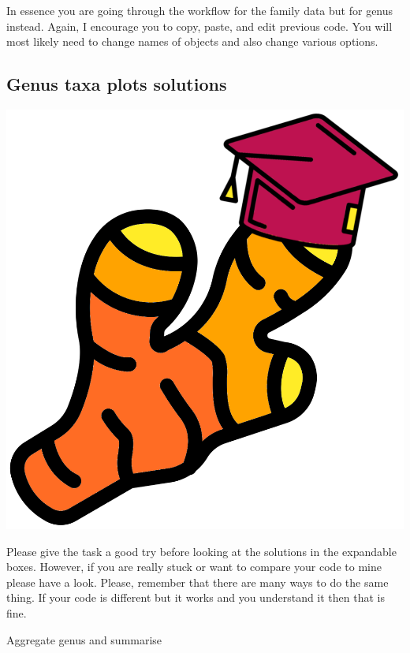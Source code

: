 \documentclass[
]{book}
\begin{document}
In essence you are going through the workflow for the family data but for genus instead.
Again, I encourage you to copy, paste, and edit previous code.
You will most likely need to change names of objects and also change various options.

\hypertarget{genus-taxa-plots-solutions}{%
\subsection{Genus taxa plots solutions}\label{genus-taxa-plots-solutions}}

\includegraphics{figures/ginger_solutions.png}

Please give the task a good try before looking at the solutions in the expandable boxes.
However, if you are really stuck or want to compare your code to mine please have a look.
Please, remember that there are many ways to do the same thing.
If your code is different but it works and you understand it then that is fine.

Aggregate genus and summarise
\end{document}

